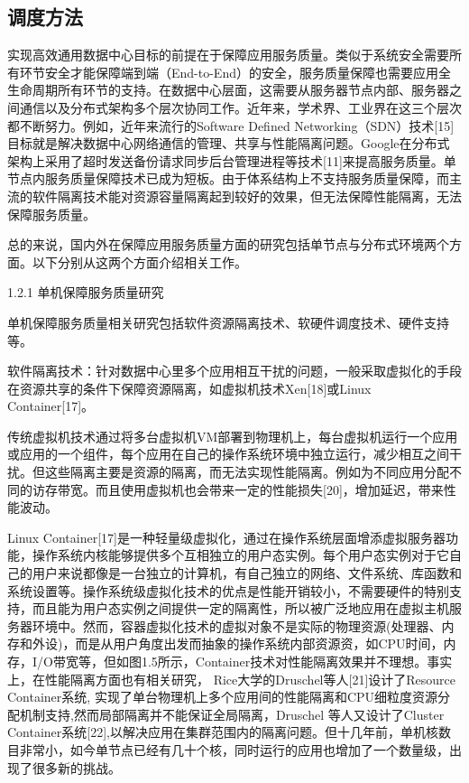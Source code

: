 \subsection{调度方法}
\label{sec:other}

实现高效通用数据中心目标的前提在于保障应用服务质量。类似于系统安全需要所有环节安全才能保障端到端（End-to-End）的安全，服务质量保障也需要应用全生命周期所有环节的支持。在数据中心层面，这需要从服务器节点内部、服务器之间通信以及分布式架构多个层次协同工作。近年来，学术界、工业界在这三个层次都不断努力。例如，近年来流行的Software Defined Networking（SDN）技术[15]目标就是解决数据中心网络通信的管理、共享与性能隔离问题。Google在分布式架构上采用了超时发送备份请求同步后台管理进程等技术[11]来提高服务质量。单节点内服务质量保障技术已成为短板。由于体系结构上不支持服务质量保障，而主流的软件隔离技术能对资源容量隔离起到较好的效果，但无法保障性能隔离，无法保障服务质量。

总的来说，国内外在保障应用服务质量方面的研究包括单节点与分布式环境两个方面。以下分别从这两个方面介绍相关工作。

1.2.1 单机保障服务质量研究

单机保障服务质量相关研究包括软件资源隔离技术、软硬件调度技术、硬件支持等。

软件隔离技术：针对数据中心里多个应用相互干扰的问题，一般采取虚拟化的手段在资源共享的条件下保障资源隔离，如虚拟机技术Xen[18]或Linux Container[17]。

传统虚拟机技术通过将多台虚拟机VM部署到物理机上，每台虚拟机运行一个应用或应用的一个组件，每个应用在自己的操作系统环境中独立运行，减少相互之间干扰。但这些隔离主要是资源的隔离，而无法实现性能隔离。例如为不同应用分配不同的访存带宽。而且使用虚拟机也会带来一定的性能损失[20]，增加延迟，带来性能波动。

Linux Container[17]是一种轻量级虚拟化，通过在操作系统层面增添虚拟服务器功能，操作系统内核能够提供多个互相独立的用户态实例。每个用户态实例对于它自己的用户来说都像是一台独立的计算机，有自己独立的网络、文件系统、库函数和系统设置等。操作系统级虚拟化技术的优点是性能开销较小，不需要硬件的特别支持，而且能为用户态实例之间提供一定的隔离性，所以被广泛地应用在虚拟主机服务器环境中。然而，容器虚拟化技术的虚拟对象不是实际的物理资源(处理器、内存和外设)，而是从用户角度出发而抽象的操作系统内部资源资，如CPU时间，内存，I/O带宽等，但如图1.5所示，Container技术对性能隔离效果并不理想。事实上，在性能隔离方面也有相关研究， Rice大学的Druschel等人[21]设计了Resource Container系统, 实现了单台物理机上多个应用间的性能隔离和CPU细粒度资源分配机制支持,然而局部隔离并不能保证全局隔离，Druschel 等人又设计了Cluster Container系统[22],以解决应用在集群范围内的隔离问题。但十几年前，单机核数目非常小，如今单节点已经有几十个核，同时运行的应用也增加了一个数量级，出现了很多新的挑战。

